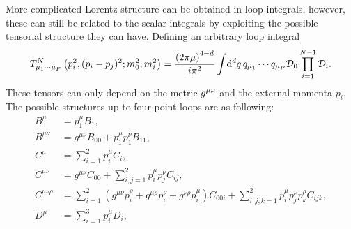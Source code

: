         More complicated Lorentz structure can be obtained in loop integrals, however, these can still be related to the scalar integrals by exploiting the possible tensorial structure they can have.
        Defining an arbitrary loop integral
        \begin{equation}
            T^N_{\mu_1\cdots\mu_P}\left(p_i^2, (p_i-p_j)^2; m_0^2, m_i^2\right) = \frac{\left(2\pi \mu\right)^{4-d}}{i \pi^2} \int \!\mathrm{d}^d q\, q_{\mu_1}\cdots q_{\mu_P} \mathcal{D}_0 \prod_{i=1}^{N-1} \mathcal{D}_i.
        \end{equation}
        These tensors can only depend on the metric \(\tensor{g}{^\mu^\nu}\) and the external momenta \(p_i\).
        The possible structures up to four-point loops are as following:
        \begin{subequations}
            \begin{align}
                B^\mu                & = p_1^\mu B_1,                                                                                                                                                                                                         \\
                B^{\mu\nu}           & = g^{\mu\nu} B_{00} + p_1^\mu p_1^\nu B_{11},                                                                                                                                                                          \\
                C^\mu                & = \sum_{i=1}^2 p_i^\mu C_i,                                                                                                                                                                                            \\
                C^{\mu\nu}           & = g^{\mu\nu} C_{00} + \sum_{i,j=1}^{2} p_i^\mu p_j^\nu C_{ij},                                                                                                                                                         \\
                C^{\mu\nu\rho}       & = \sum_{i=1}^2 (g^{\mu\nu} p_i^{\rho} + g^{\mu\rho} p_i^{\nu} + g^{\nu\rho} p_i^{\mu}) C_{00i} + \sum_{i,j,k=1}^2 p_i^\mu p_j^\nu p_k^\rho C_{ijk},                                                                    \\
                D^\mu                & = \sum_{i=1}^3 p_i^\mu D_i,                                                                                                                                                                                            \\

\end{align}
\end{subequations}

